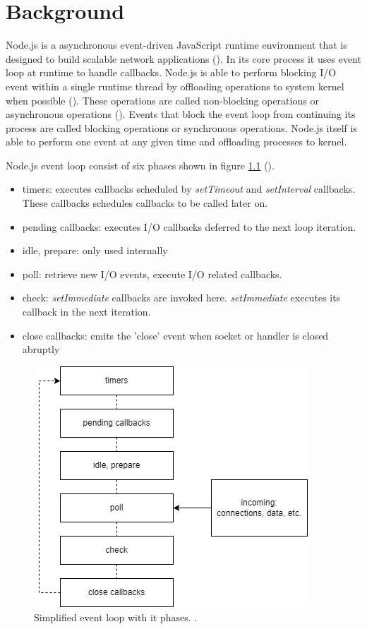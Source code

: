 \chapter{Background\label{background}}
Node.js is a asynchronous event-driven JavaScript runtime environment that is designed to build scalable network applications (\cite{node.jsAbout}).
In its core process it uses event loop at runtime to handle callbacks.
Node.js is able to perform blocking I/O event within a single runtime thread by offloading operations to system kernel when possible (\cite{node.jsEventLoop}).
These operations are called non-blocking operations or asynchronous operations (\cite{node.jsOverviewBlockVsNonBlock}).
Events that block the event loop from continuing its process are called blocking operations or synchronous operations.
Node.js itself is able to perform one event at any given time and offloading processes to kernel.

Node.js event loop consist of six phases shown in figure \ref{figure:nodejs:eventloop} (\cite{node.jsEventLoop}).
\begin{itemize}
    \item
    timers: executes callbacks scheduled by \textit{setTimeout} and \textit{setInterval} callbacks. These callbacks schedules callbacks to be called later on.
    \item
    pending callbacks: executes I/O callbacks deferred to the next loop iteration.
    \item
    idle, prepare: only used internally
    \item
    poll: retrieve new I/O events, execute I/O related callbacks.
    \item
    check: \textit{setImmediate} callbacks are invoked here. \textit{setImmediate} executes its callback in the next iteration.
    \item
    close callbacks: emits the 'close' event when socket or handler is closed abruptly
\end{itemize}

\begin{figure}[ht!]
    \includegraphics[scale=0.8]{images/event_loop.png}
    \caption{Simplified event loop with it phases. \cite{node.jsEventLoop}.}
    \label{figure:nodejs:eventloop}
\end{figure}

